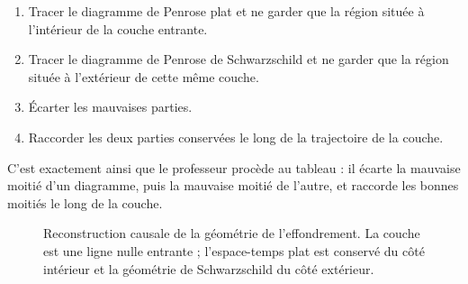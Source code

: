 \begin{enumerate}
\item Tracer le diagramme de Penrose plat et ne garder que la région située à l’intérieur de la couche entrante.
\item Tracer le diagramme de Penrose de Schwarzschild et ne garder que la région située à l’extérieur de cette même couche.
\item Écarter les mauvaises parties.
\item Raccorder les deux parties conservées le long de la trajectoire de la couche.
\end{enumerate}

C’est exactement ainsi que le professeur procède au tableau : il écarte la mauvaise moitié d’un diagramme, puis la mauvaise moitié de l’autre, et raccorde les bonnes moitiés le long de la couche.

\begin{figure}[htbp]
\centering
{}
\caption{Reconstruction causale de la géométrie de l’effondrement. La couche est une ligne nulle entrante ; l’espace-temps plat est conservé du côté intérieur et la géométrie de Schwarzschild du côté extérieur.}
\end{figure}

